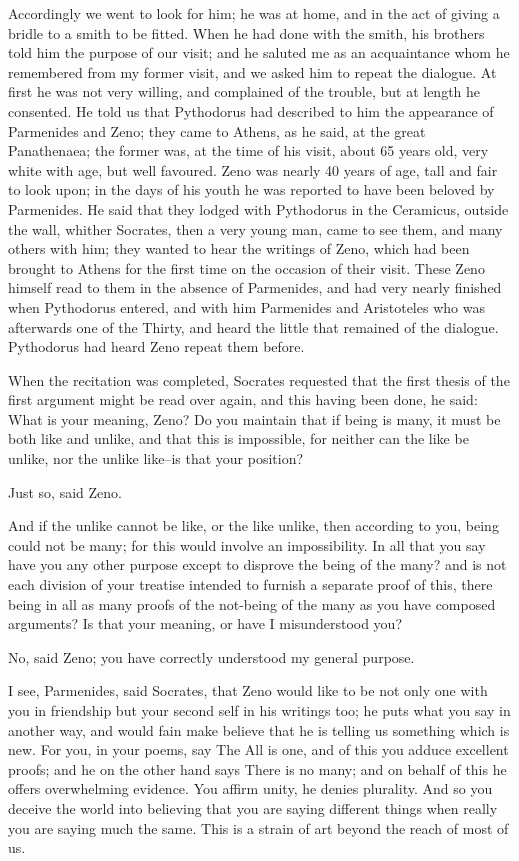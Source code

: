 Accordingly we went to look for him; he was at home, and in the act
of giving a bridle to a smith to be fitted. When he had done with the
smith, his brothers told him the purpose of our visit; and he saluted me
as an acquaintance whom he remembered from my former visit, and we
asked him to repeat the dialogue. At first he was not very willing, and
complained of the trouble, but at length he consented. He told us that
Pythodorus had described to him the appearance of Parmenides and Zeno;
they came to Athens, as he said, at the great Panathenaea; the former
was, at the time of his visit, about 65 years old, very white with age,
but well favoured. Zeno was nearly 40 years of age, tall and fair to
look upon; in the days of his youth he was reported to have been
beloved by Parmenides. He said that they lodged with Pythodorus in the
Ceramicus, outside the wall, whither Socrates, then a very young man,
came to see them, and many others with him; they wanted to hear the
writings of Zeno, which had been brought to Athens for the first time
on the occasion of their visit. These Zeno himself read to them in the
absence of Parmenides, and had very nearly finished when Pythodorus
entered, and with him Parmenides and Aristoteles who was afterwards
one of the Thirty, and heard the little that remained of the dialogue.
Pythodorus had heard Zeno repeat them before.

When the recitation was completed, Socrates requested that the first
thesis of the first argument might be read over again, and this having
been done, he said: What is your meaning, Zeno? Do you maintain that
if being is many, it must be both like and unlike, and that this is
impossible, for neither can the like be unlike, nor the unlike like--is
that your position?

Just so, said Zeno.

And if the unlike cannot be like, or the like unlike, then according to
you, being could not be many; for this would involve an impossibility.
In all that you say have you any other purpose except to disprove the
being of the many? and is not each division of your treatise intended to
furnish a separate proof of this, there being in all as many proofs of
the not-being of the many as you have composed arguments? Is that your
meaning, or have I misunderstood you?

No, said Zeno; you have correctly understood my general purpose.

I see, Parmenides, said Socrates, that Zeno would like to be not only
one with you in friendship but your second self in his writings too; he
puts what you say in another way, and would fain make believe that he is
telling us something which is new. For you, in your poems, say The All
is one, and of this you adduce excellent proofs; and he on the other
hand says There is no many; and on behalf of this he offers overwhelming
evidence. You affirm unity, he denies plurality. And so you deceive the
world into believing that you are saying different things when really
you are saying much the same. This is a strain of art beyond the reach
of most of us.

